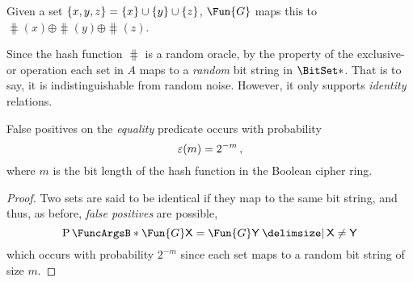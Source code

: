 \documentclass[ ../main.tex]{subfiles}
\begin{document}
Given a set $\{x,y,z\} = \{x\} \SetUnion \{y\} \SetUnion \{z\}$, $\Fun{G}$ maps this to $\hash(x) \oplus \hash(y) \oplus \hash(z)$.

Since the hash function $\hash$ is a random oracle, by the property of the exclusive-or operation each set in $A$ maps to a \emph{random} bit string in ${\BitSet*}$. That is to say, it is indistinguishable from random noise.
However, it only supports \emph{identity} relations.
\begin{theorem}
False positives on the \emph{equality} predicate occurs with probability
\begin{equation}
	\varepsilon(m) = 2^{-m}\,,
\end{equation}
where $m$ is the bit length of the hash function in the Boolean cipher ring.
\end{theorem}
\begin{proof}
Two sets are said to be identical if they map to the same bit string, and thus, as before, \emph{false positives} are possible,
\begin{equation}
	\Prob{\Fun{G} \Set{X} = \Fun{G} \Set{Y} \Given \Set{X} \neq \Set{Y}}
\end{equation}
which occurs with probability $2^{-m}$ since each set maps to a random bit string of size $m$.
\end{proof}
\end{document}
